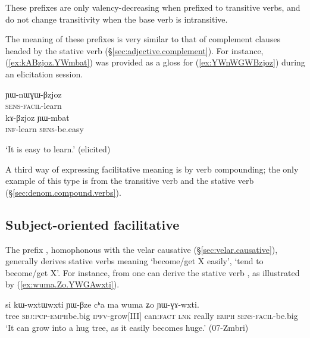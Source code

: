 These prefixes are only valency-decreasing when prefixed to transitive verbs, and do not change transitivity when the base verb is intransitive.

The meaning of these prefixes is very similar to that of complement clauses headed by the stative verb  (§\ref{sec:adjective.complement}). For instance, (\ref{ex:kABzjoz.YWmbat}) was provided as a gloss for (\ref{ex:YWnWGWBzjoz}) during an elicitation session.

\begin{exe}
\ex 
\begin{xlist}
\ex \label{ex:YWnWGWBzjoz}
\gll ɲɯ-nɯɣɯ-βzjoz \\
\textsc{sens}-\textsc{facil}-learn \\
\ex \label{ex:kABzjoz.YWmbat}
\gll kɤ-βzjoz ɲɯ-mbat \\
\textsc{inf}-learn \textsc{sens}-be.easy \\
\end{xlist}
\glt `It is easy to learn.' (elicited)
\end{exe}

A third way of expressing facilitative meaning is by verb compounding; the only example of this type is  from the transitive verb  and the stative verb    (§\ref{sec:denom.compound.verbs}).
 
\subsection{Subject-oriented facilitative} \label{sec:facilitative.GA}
The prefix , homophonous with the velar causative  (§\ref{sec:velar.causative}), generally derives stative verbs meaning `become/get X easily', `tend to become/get X'. For instance, from  one can derive the stative verb , as illustrated by (\ref{ex:wuma.Zo.YWGAwxti}). 

\begin{exe}
\ex \label{ex:wuma.Zo.YWGAwxti}
\gll si kɯ-wxtɯ\redp{}wxti ɲɯ-βze cʰa ma wuma ʑo ɲɯ-ɣɤ-wxti.  \\
tree \textsc{sbj}:\textsc{pcp}-\textsc{emph}\redp{}be.big \textsc{ipfv}-grow[III] can:\textsc{fact} \textsc{lnk} really \textsc{emph} \textsc{sens}-\textsc{facil}-be.big \\
\glt `It can grow into a hug tree, as it easily becomes huge.' (07-Zmbri) 	
\end{exe}
 
